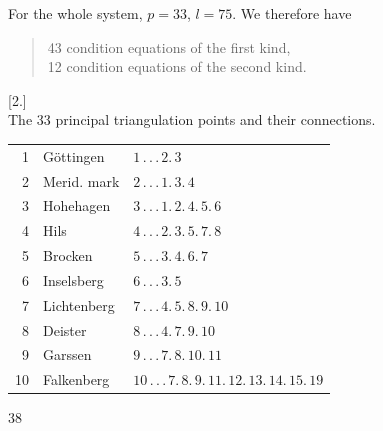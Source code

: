 For the whole system, $p=33$, $l=75$. We therefore have
\begin{quote}
43 condition equations of the first kind,\\
12 condition equations of the second kind.
\end{quote}
\begin{center}
[2.]\\[3pt]
The 33 principal triangulation points and their connections.
\end{center}
\noindent
\begin{tabular}{r|l|l}
1&Göttingen&$1\,.\,.\,.\,2.\,3$\\
2&Merid. mark&$2\,.\,.\,.\,1.\,3.\,4$\\
3&Hohehagen&$3\,.\,.\,.\,1.\,2.\,4.\,5.\,6$\\
4&Hils&$4\,.\,.\,.\,2.\,3.\,5.\,7.\,8$\\
5&Brocken&$5\,.\,.\,.\,3.\,4.\,6.\,7$\\
6&Inselsberg&$6\,.\,.\,.\,3.\,5$\\
7&Lichtenberg&$7\,.\,.\,.\,4.\,5.\,8.\,9.\,10$\\
8&Deister&$8\,.\,.\,.\,4.\,7.\,9.\,10$\\
9&Garssen&$9\,.\,.\,.\,7.\,8.\,10.\,11$\\
10&Falkenberg&$10\,.\,.\,.\,7.\,8.\,9.\,11.\,12.\,13.\,14.\,15.\,19$
\end{tabular}
\vfill
{}\hfill38

